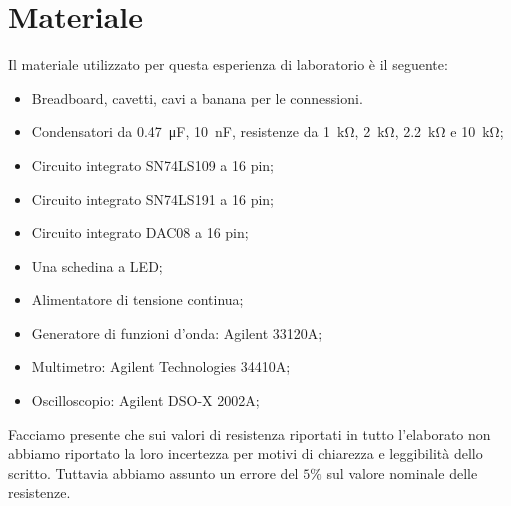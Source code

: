 \section*{Materiale}

Il materiale utilizzato per questa esperienza di laboratorio è il seguente:

\begin{itemize} \itemsep2pt \parskip0pt 
    \item{Breadboard, cavetti, cavi a banana per le connessioni.}
    \item{Condensatori da \SI{0.47}{\micro\farad}, \SI{10}{\nano\farad},  resistenze da \SI{1}{\kilo\ohm}, \SI{2}{\kilo\ohm}, \SI{2.2}{\kilo\ohm} e \SI{10}{\kilo\ohm};}
    \item{Circuito integrato SN74LS109 a 16 pin;}
    \item{Circuito integrato SN74LS191 a 16 pin;}
    \item{Circuito integrato DAC08 a 16 pin;}
	\item{Una schedina a LED;}
    \item{Alimentatore di tensione continua;}
    \item{Generatore di funzioni d'onda: Agilent 33120A;}
    \item{Multimetro: Agilent Technologies 34410A;}
    \item{Oscilloscopio: Agilent DSO-X 2002A;}
\end{itemize}

Facciamo presente che sui valori di resistenza riportati in tutto l'elaborato non abbiamo riportato la loro incertezza per motivi di chiarezza e leggibilità dello scritto. Tuttavia abbiamo assunto un errore del $5\%$ sul valore nominale delle resistenze.